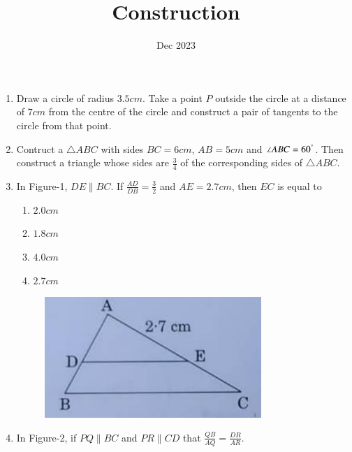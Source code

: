 \documentclass[12pt,-letter paper]{article}
\title{Construction}
\date{Dec 2023}
\begin{document}
\maketitle

\begin{enumerate}
	\item Draw a circle of radius $3.5 cm$. Take a point $P$ outside the circle at a distance of $7 cm$ from the centre of the circle and construct a pair of tangents to the circle from that point.
	\item Contruct a $\triangle ABC $ with sides $BC = 6 cm$, $AB = 5 cm$ and $\angle ABC = 60^\degree$. Then construct a triangle whose sides are $\frac{3}{4}$ of the corresponding sides of $\triangle ABC$.
	\item In Figure-1, $DE \parallel BC $. If $\frac{AD}{DB}=\frac{3}{2}$ and $AE = 2.7 cm$, then $EC$ is equal to
		\begin{enumerate}
		\item $2.0 cm$ 
                \item $1.8 cm$
		\item $4.0 cm$
		\item $2.7 cm$
		\end{enumerate}
		\begin{figure}[!ht]
			\begin{center}
				\includegraphics[width=\columnwidth]{figs/Construction-1.jpg}
			\end{center}
			\caption{}
			\label{fig:Construction-1.jpg}
		\end{figure}
		\newpage
	\item In Figure-2, if $PQ \parallel BC$ and $PR \parallel CD$ that $\frac{QB}{AQ} = \frac{DR}{AR}$.



		\begin{figure}[!ht]


\end{figure}
\end{enumerate}
\end{document}
